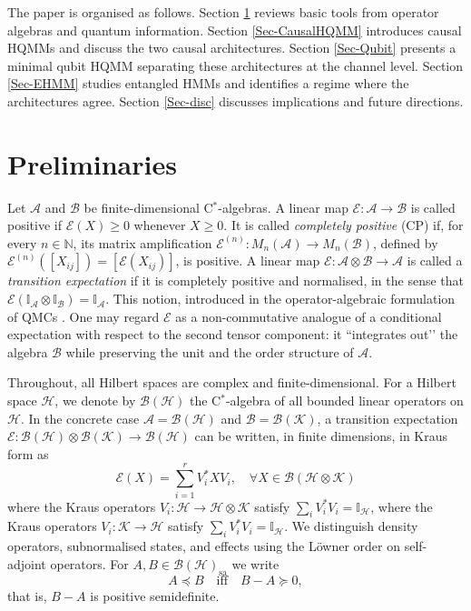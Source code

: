 \documentclass[11pt, reco]{article}
\begin{document}
The paper is organised as follows. Section \ref{Sec-Pre} reviews  basic tools from   operator algebras and quantum information. Section \ref{Sec-CausalHQMM} introduces causal HQMMs and discuss the two causal architectures. Section \ref{Sec-Qubit} presents a minimal qubit HQMM separating these architectures at the channel level. Section \ref{Sec-EHMM} studies entangled HMMs and identifies a regime where the architectures agree. Section \ref{Sec-disc} discusses implications and future directions.

\section{Preliminaries}\label{Sec-Pre}
Let \(\mathcal{A}\) and \(\mathcal{B}\) be finite-dimensional C\(^*\)-algebras.
A linear map \(\mathcal{E}:\mathcal{A} \to\mathcal{B} \) is called positive if \(\mathcal{E}(X)\ge 0\) whenever \(X\ge 0\). It is called \emph{completely positive} (CP) if, for every \(n\in\mathbb{N}\), its matrix amplification \(\mathcal{E}^{(n)}:M_n(\mathcal{A})\to M_n(\mathcal{B})\), defined by \(\mathcal{E}^{(n)}([X_{ij}]) = [\mathcal{E}(X_{ij})]\), is positive.
 A linear map \(\mathcal{E}:\mathcal{A}\otimes\mathcal{B}\to\mathcal{A}\) is called a \emph{transition expectation} if it is completely positive and normalised, in the sense that \(\mathcal{E}(\mathbb{I}_{\mathcal{A}}\otimes\mathbb{I}_{\mathcal{B}})=\mathbb{I}_{\mathcal{A}}\). This notion, introduced in the operator-algebraic formulation of QMCs  \cite{Acc74,ASS20}. One may regard \(\mathcal{E}\) as a non-commutative analogue of a conditional expectation with respect to the second tensor component: it “integrates out’’ the algebra \(\mathcal{B}\) while preserving the unit and the order structure of \(\mathcal{A}\).

 Throughout, all Hilbert spaces are complex and finite-dimensional. For a Hilbert space \(\mathcal{H}\), we denote by \(\mathcal{B}(\mathcal{H})\) the C\(^*\)-algebra of all bounded linear operators on \(\mathcal{H}\).
 In the concrete case \(\mathcal{A}=\mathcal{B}(\mathcal{H})\) and \(\mathcal{B}=\mathcal{B}(\mathcal{K})\), a transition expectation \(\mathcal{E}:\mathcal{B}(\mathcal{H})\otimes\mathcal{B}(\mathcal{K})\to\mathcal{B}(\mathcal{H})\) can be written, in finite dimensions, in Kraus form as
\[\mathcal{E}(X)=\sum_{i=1}^r V_i^* X V_i,\quad \forall X\in\mathcal{B}(\mathcal{H}\otimes\mathcal{K})
\]
where the Kraus operators \(V_i:\mathcal{H}\to\mathcal{H}\otimes\mathcal{K}\) satisfy \(\sum_i V_i^*V_i=\mathbb{I}_{\mathcal{H}}\),
where the Kraus operators \(V_i:\mathcal{K}\to\mathcal{H}\) satisfy \(\sum_i V_i^*V_i=\mathbb{I}_{\mathcal{H}}\). We distinguish density operators, subnormalised states, and effects using the L\"owner order on self-adjoint operators. For $A,B\in\mathcal{B}(\mathcal{H})_{\mathrm{sa}}$ we write
\[
A \preceq B
\quad\text{iff}\quad
B-A \succeq 0,
\]
that is, $B-A$ is positive semidefinite.
\end{document}

